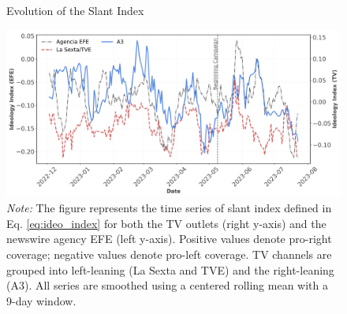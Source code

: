 \documentclass[12pt]{article}
\begin{document}
\begin{figure}[!htb]
	\caption{Evolution of the Slant Index}
	\centering
	\includegraphics[width=150mm]{figures/tv_vs_efe_net_diff}
	\caption*{\small \textit{Note:} The figure represents the time series of slant index defined in Eq. \eqref{eq:ideo_index} for both the  TV outlets (right y-axis) and the newswire agency EFE (left y-axis). Positive values denote pro-right coverage; negative values denote pro-left coverage. TV channels are grouped into left-leaning (La Sexta and TVE) and the right-leaning (A3). All series are smoothed using a centered rolling mean with a 9-day window.}
	\label{fig:net_tone}
\end{figure}


\end{document}
